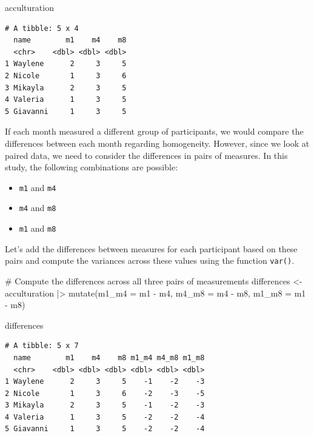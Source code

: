 \documentclass[
  letterpaper,
]{krantz}
\makeatletter
\newenvironment{Shaded}{\begin{snugshade}}{\end{snugshade}}
\newcommand{\AttributeTok}[1]{\textcolor[rgb]{0.40,0.45,0.13}{#1}}
\newcommand{\CommentTok}[1]{\textcolor[rgb]{0.37,0.37,0.37}{#1}}
\newcommand{\FunctionTok}[1]{\textcolor[rgb]{0.28,0.35,0.67}{#1}}
\newcommand{\NormalTok}[1]{\textcolor[rgb]{0.00,0.23,0.31}{#1}}
\newcommand{\OtherTok}[1]{\textcolor[rgb]{0.00,0.23,0.31}{#1}}
\newcommand{\SpecialCharTok}[1]{\textcolor[rgb]{0.37,0.37,0.37}{#1}}
\newenvironment{kframe}{%
\medskip{}
\setlength{\fboxsep}{.8em}
 \def\at@end@of@kframe{}%
 \ifinner\ifhmode%
  \def\at@end@of@kframe{\end{minipage}}%
  \begin{minipage}{\columnwidth}%
 \fi\fi%
 \def\FrameCommand##1{\hskip\@totalleftmargin \hskip-\fboxsep
 \colorbox{shadecolor}{##1}\hskip-\fboxsep
     \hskip-\linewidth \hskip-\@totalleftmargin \hskip\columnwidth}%
 \MakeFramed {\advance\hsize-\width
   \@totalleftmargin\z@ \linewidth\hsize
   \@setminipage}}%
 {\par\unskip\endMakeFramed%
 \at@end@of@kframe}
\renewenvironment{Shaded}{\begin{kframe}}{\end{kframe}}
\makeatother
\begin{document}
\begin{Shaded}
\begin{Highlighting}[]
\NormalTok{acculturation}
\end{Highlighting}
\end{Shaded}

\begin{verbatim}
# A tibble: 5 x 4
  name        m1    m4    m8
  <chr>    <dbl> <dbl> <dbl>
1 Waylene      2     3     5
2 Nicole       1     3     6
3 Mikayla      2     3     5
4 Valeria      1     3     5
5 Giavanni     1     3     5
\end{verbatim}

If each month measured a different group of participants, we would
compare the differences between each month regarding homogeneity.
However, since we look at paired data, we need to consider the
differences in pairs of measures. In this study, the following
combinations are possible:

\begin{itemize}
\item
  \texttt{m1} and \texttt{m4}
\item
  \texttt{m4} and \texttt{m8}
\item
  \texttt{m1} and \texttt{m8}
\end{itemize}

Let's add the differences between measures for each participant based on
these pairs and compute the variances across these values using the
function \texttt{var()}.

\begin{Shaded}
\begin{Highlighting}[]
\CommentTok{\# Compute the differences across all three pairs of measurements}
\NormalTok{differences }\OtherTok{\textless{}{-}}
\NormalTok{  acculturation }\SpecialCharTok{|\textgreater{}}
  \FunctionTok{mutate}\NormalTok{(}\AttributeTok{m1\_m4 =}\NormalTok{ m1 }\SpecialCharTok{{-}}\NormalTok{ m4,}
         \AttributeTok{m4\_m8 =}\NormalTok{ m4 }\SpecialCharTok{{-}}\NormalTok{ m8,}
         \AttributeTok{m1\_m8 =}\NormalTok{ m1 }\SpecialCharTok{{-}}\NormalTok{ m8)}

\NormalTok{differences}
\end{Highlighting}
\end{Shaded}

\begin{verbatim}
# A tibble: 5 x 7
  name        m1    m4    m8 m1_m4 m4_m8 m1_m8
  <chr>    <dbl> <dbl> <dbl> <dbl> <dbl> <dbl>
1 Waylene      2     3     5    -1    -2    -3
2 Nicole       1     3     6    -2    -3    -5
3 Mikayla      2     3     5    -1    -2    -3
4 Valeria      1     3     5    -2    -2    -4
5 Giavanni     1     3     5    -2    -2    -4
\end{verbatim}
\end{document}
